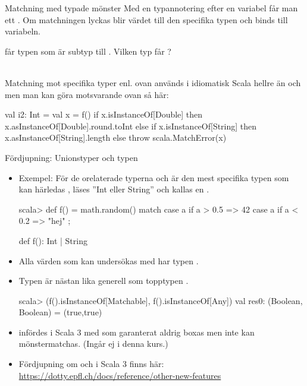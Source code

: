 \begin{Slide}{Matchning med typade mönster}\SlideFontSmall
Med en typannotering efter en variabel får man ett  . Om matchningen lyckas blir värdet  till den specifika typen och binds till variabeln.
 får typen  som är subtyp till . Vilken typ får ? \pause ~~
{\SlideFontTiny \\\vspace{0.5em} Matchning mot specifika typer enl. ovan används i idiomatisk Scala hellre än  och  men man kan göra motsvarande ovan så här:
\begin{Code}
val i2: Int =  
  val x = f()
  if x.isInstanceOf[Double] then x.asInstanceOf[Double].round.toInt
  else if x.isInstanceOf[String] then x.asInstanceOf[String].length
  else throw scala.MatchError(x)
\end{Code}
}
\end{Slide}

\begin{Slide}{Fördjupning: Unionstyper och typen }
\begin{itemize}\SlideFontSmall
\item Exempel: För de orelaterade typerna  och  är den mest specifika typen som kan härledas , läses ''Int eller String'' och kallas en  .

\begin{REPLsmall}
scala> def f() = math.random() match
          case a if a > 0.5 => 42
          case a if a < 0.2 => "hej"
        ;

def f(): Int | String
\end{REPLsmall}

\item Alla värden som kan undersökas med  har typen  .
\item Typen  är nästan lika generell som topptypen . 
\begin{REPLsmall}
scala> (f().isInstanceOf[Matchable], f().isInstanceOf[Any])
val res0:  (Boolean, Boolean) = (true,true)
\end{REPLsmall}


\item {} infördes i Scala 3 med  som garanterat aldrig boxas men inte kan mönstermatchas. (Ingår ej i denna kurs.)
\item Fördjupning om  och  i Scala 3 finns här:
\\\url{https://dotty.epfl.ch/docs/reference/other-new-features}
\end{itemize}
\end{Slide}

